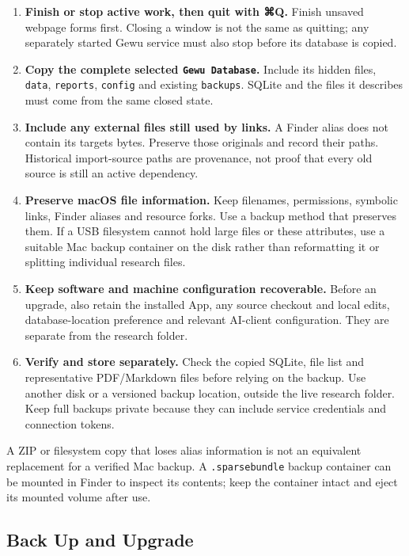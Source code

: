 \documentclass[10pt,letterpaper,oneside]{scrreprt}
\providecommand{\tightlist}{\setlength{\itemsep}{1pt}\setlength{\parskip}{0pt}}
\begin{document}
\begin{enumerate}
\tightlist
\item
  \textbf{Finish or stop active work, then quit with {{\symbolfont ⌘}Q}.} Finish unsaved webpage forms first. Closing a window is not the same as quitting; any separately started Gewu service must also stop before its database is copied.
\item
  \textbf{Copy the complete selected \texttt{Gewu\ Database}.} Include its hidden files, \texttt{data}, \texttt{reports}, \texttt{config} and existing \texttt{backups}. SQLite and the files it describes must come from the same closed state.
\item
  \textbf{Include any external files still used by links.} A Finder alias does not contain its target\textquotesingle s bytes. Preserve those originals and record their paths. Historical import-source paths are provenance, not proof that every old source is still an active dependency.
\item
  \textbf{Preserve macOS file information.} Keep filenames, permissions, symbolic links, Finder aliases and resource forks. Use a backup method that preserves them. If a USB filesystem cannot hold large files or these attributes, use a suitable Mac backup container on the disk rather than reformatting it or splitting individual research files.
\item
  \textbf{Keep software and machine configuration recoverable.} Before an upgrade, also retain the installed App, any source checkout and local edits, database-location preference and relevant AI-client configuration. They are separate from the research folder.
\item
  \textbf{Verify and store separately.} Check the copied SQLite, file list and representative PDF/Markdown files before relying on the backup. Use another disk or a versioned backup location, outside the live research folder. Keep full backups private because they can include service credentials and connection tokens.
\end{enumerate}

A ZIP or filesystem copy that loses alias information is not an equivalent replacement for a verified Mac backup. A \texttt{.sparsebundle} backup container can be mounted in Finder to inspect its contents; keep the container intact and eject its mounted volume after use.

\subsection{Back Up and Upgrade}\label{upgrade-installation}
\end{document}
